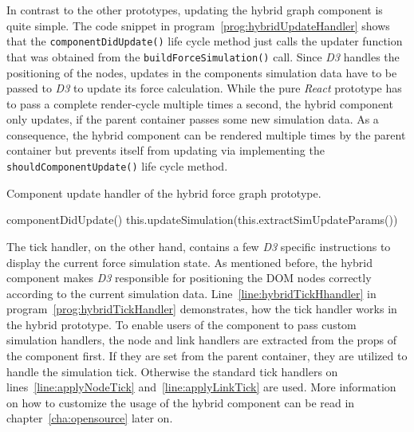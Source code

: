 In contrast to the other prototypes, updating the hybrid graph component is quite simple. The code snippet in program~\ref{prog:hybridUpdateHandler} shows that the \texttt{componentDidUpdate()} life cycle method just calls the updater function that was obtained from the \texttt{build\-Force\-Simulation()} call. Since \emph{D3} handles the positioning of the nodes, updates in the components simulation data have to be passed to \emph{D3} to update its force calculation. While the pure \emph{React} prototype has to pass a complete render-cycle multiple times a second, the hybrid component only updates, if the parent container passes some new simulation data. As a consequence, the hybrid component can be rendered multiple times by the parent container but prevents itself from updating via implementing the \texttt{shouldComponentUpdate()} life cycle method.

\begin{program}
\caption{Component update handler of the hybrid force graph prototype.}
\label{prog:hybridUpdateHandler}
\begin{JsCode}
componentDidUpdate() {
  this.updateSimulation(this.extractSimUpdateParams())
}
\end{JsCode}
\end{program}

The tick handler, on the other hand, contains a few \emph{D3} specific instructions to display the current force simulation state. As mentioned before, the hybrid component makes \emph{D3} responsible for positioning the DOM nodes correctly according to the current simulation data. Line~\ref{line:hybridTickHhandler} in program~\ref{prog:hybridTickHandler} demonstrates, how the tick handler works in the hybrid prototype. To enable users of the component to pass custom simulation handlers, the node and link handlers are extracted from the props of the component first. If they are set from the parent container, they are utilized to handle the simulation tick. Otherwise the standard tick handlers on lines~\ref{line:applyNodeTick} and~\ref{line:applyLinkTick} are used. More information on how to customize the usage of the hybrid component can be read in chapter~\ref{cha:opensource} later on.

